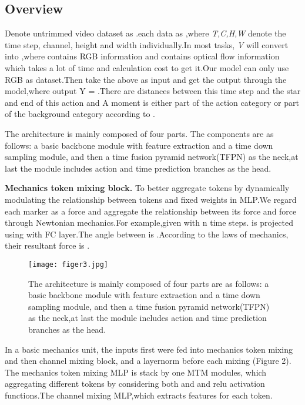 \documentclass[10pt,twocolumn,letterpaper]{article}
\begin{document}
\subsection{Overview}
Denote untrimmed video dataset as .each data as ,where \emph{T,C,H,W} denote the time step, channel, height and width individually.In most tasks, \emph{V} will convert into ,where  
contains RGB information and  contains optical flow information which takes a lot of time and calculation cost to get it.Our model can only use RGB as dataset.Then take the above as input and get the output through the model,where output Y =  .There are  distances between this time step and the star and end of this action and A moment is either part of the action category or part of the background category according to .

The architecture is mainly composed of four parts. The components are as follows: a basic backbone module with feature extraction and a time down sampling module, and then a time fusion pyramid network(TFPN) as the neck,at last the module includes action and time prediction branches as the head.



\textbf{Mechanics token mixing block.}
To better aggregate tokens by dynamically modulating the relationship between tokens and fixed weights in MLP.We regard each marker as a force and aggregate the relationship between its force and force through Newtonian mechanics.For example,given with n time steps. is projected using  with FC layer.The angle between  is .According to the laws of mechanics, their resultant force is .
\begin{figure}
  \center
\texttt{[image: figer3.jpg]}
   \caption{The architecture is mainly composed of four parts are as follows: a basic backbone module with feature extraction and a time down sampling module, and then a time fusion pyramid network(TFPN) as the neck,at last the module includes action and time prediction branches as the head.}
    \label{fig3}
\end{figure}

In a basic mechanics unit, the inputs first were fed into mechanics token mixing and then channel mixing block, and a layernorm before each mixing (Figure 2). The mechanics token mixing MLP is stack by one MTM modules, which aggregating different tokens by considering both  and   and relu activation functions.The channel mixing MLP,which extracts features for each token. 
\end{document}
